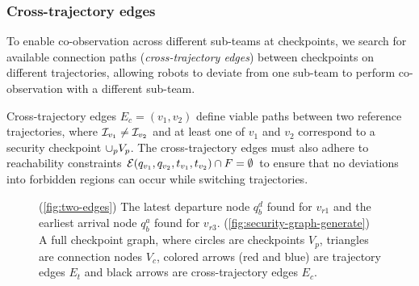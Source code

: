 \documentclass[10pt,twocolumn,twoside]{IEEEtran}
\newcommand{\news}{\color{blue}}
\begin{document}

\subsubsection{Cross-trajectory edges}\label{sec:cross-traj-edges}
To enable co-observation across different sub-teams at checkpoints, we search for available connection paths (\emph{cross-trajectory edges}) between checkpoints on different trajectories, allowing robots to deviate from one sub-team to perform co-observation with a different sub-team. 

Cross-trajectory edges $E_c = (v_1, v_2)$ define viable paths between two reference trajectories, where $\mathcal{I}_{v_1}\neq\mathcal{I}_{v_2}$ and at least one of $v_1 $ and $v_2$ correspond to a security checkpoint $\cup_p V_p$. The cross-trajectory edges must also adhere to reachability constraints $\mathcal{E}(q_{v_1}, q_{v_2}, t_{v_1},t_{v_2}) \cap F = \emptyset$ to ensure that no deviations into forbidden regions can occur {\news while switching trajectories}.  

\begin{figure}[htbp]
    \centering
  \caption{{\news (\ref{fig:two-edges}) The latest departure node $q^{d}_{b}$ found for $v_{r1}$ and the earliest arrival node $q^{a}_{b}$ found for $v_{r3}$. (\ref{fig:security-graph-generate}) A full checkpoint graph, where circles are checkpoints $V_p$, triangles are connection nodes $V_c$, colored arrows (red and blue) are trajectory edges $E_t$ and black arrows are cross-trajectory edges $E_c$.}}  
\end{figure}
\end{document}
